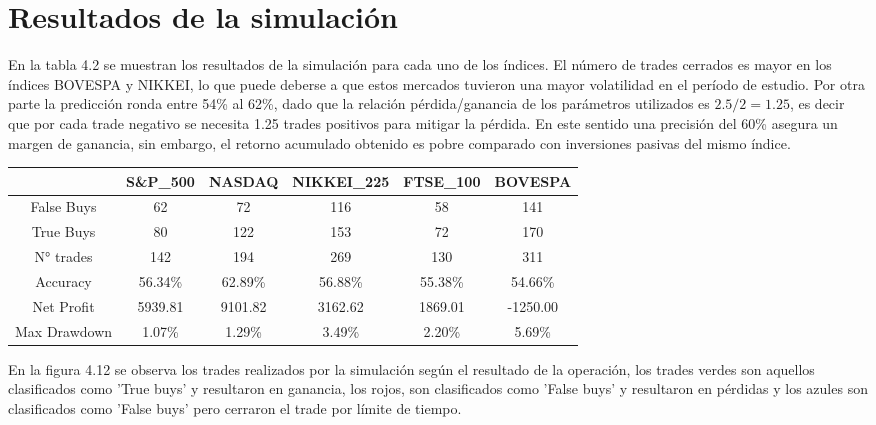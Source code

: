 \documentclass[a4paper,12pt]{Latex/Classes/PhDthesisPSnPDF}
\begin{document}
\section{Resultados de la simulación}


En la tabla 4.2 se muestran los resultados de la simulación para cada uno de los índices. El número de trades cerrados es mayor en los índices BOVESPA y NIKKEI, lo que puede deberse a que estos mercados tuvieron una mayor volatilidad en el período de estudio. Por otra parte la predicción ronda entre 54\% al 62\%, dado que la relación pérdida/ganancia de los parámetros utilizados es $2.5/2 = 1.25$, es decir que por cada trade negativo se necesita 1.25 trades positivos para mitigar la pérdida. En este sentido una precisión del 60\% asegura un margen de ganancia, sin embargo, el retorno acumulado obtenido es pobre comparado con inversiones pasivas del mismo índice. 

\begin{center}
\begin{table}[ht]
\centering
\begin{tabular}{cccccc}
  \hline
 & S\&P\_500 & NASDAQ & NIKKEI\_225 & FTSE\_100 & BOVESPA \\ 
  \hline
False Buys & 62 & 72 & 116 & 58 & 141 \\ 
  True Buys & 80 & 122 & 153 & 72 & 170 \\ 
  N° trades & 142 & 194 & 269 & 130 & 311 \\ 
  Accuracy & 56.34\% & 62.89\% & 56.88\% & 55.38\% & 54.66\% \\ 
  Net Profit & 5939.81 & 9101.82 & 3162.62 & 1869.01 & -1250.00 \\ 
  Max Drawdown & 1.07\% & 1.29\% & 3.49\% & 2.20\% & 5.69\% \\ 
   \hline
\end{tabular}
\end{table}\end{center}
 

En la figura 4.12 se observa los trades realizados por la simulación según el resultado de la operación, los trades verdes son aquellos clasificados como 'True buys' y resultaron en ganancia, los rojos, son clasificados como 'False buys' y resultaron en pérdidas y los azules son clasificados como 'False buys' pero cerraron el trade por límite de tiempo.
\end{document}

